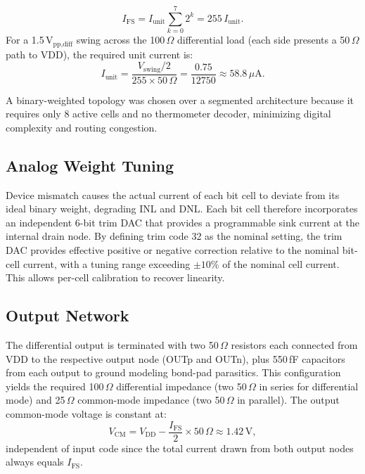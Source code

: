 \documentclass[lettersize,journal]{IEEEtran}
\begin{document}
%
\begin{equation}
  I_\text{FS} = I_\text{unit} \sum_{k=0}^{7} 2^k = 255\, I_\text{unit}.
  \label{eq:ifs}
\end{equation}
%
For a 1.5\,V$_{\text{pp,diff}}$ swing across the 100\,$\Omega$ differential load
(each side presents a 50\,$\Omega$ path to VDD), the required unit current is:
%
\begin{equation}
  I_\text{unit} = \frac{V_\text{swing}/2}{255 \times 50\,\Omega}
                = \frac{0.75}{12750} \approx 58.8\,\mu\text{A}.
  \label{eq:iunit}
\end{equation}

A binary-weighted topology was chosen over a segmented architecture because it
requires only 8 active cells and no thermometer decoder, minimizing digital
complexity and routing congestion.

\subsection{Analog Weight Tuning}

Device mismatch causes the actual current of each bit cell to deviate from its
ideal binary weight, degrading INL and DNL.
Each bit cell therefore incorporates an independent 6-bit trim DAC that provides a programmable sink current at the internal drain node. By defining trim code 32 as the nominal setting, the trim DAC provides effective positive or negative correction relative to the nominal bit-cell current, with a tuning range exceeding $\pm 10\%$ of the nominal cell current. This allows per-cell calibration to recover linearity.

\subsection{Output Network}

The differential output is terminated with two 50\,$\Omega$ resistors each
connected from VDD to the respective output node (OUTp and OUTn), plus
550\,fF capacitors from each output to ground modeling bond-pad parasitics.
This configuration yields the required 100\,$\Omega$ differential impedance
(two 50\,$\Omega$ in series for differential mode) and 25\,$\Omega$
common-mode impedance (two 50\,$\Omega$ in parallel).
The output common-mode voltage is constant at:
%
\begin{equation}
  V_\text{CM} = V_\text{DD} - \frac{I_\text{FS}}{2} \times 50\,\Omega \approx 1.42\,\text{V},
  \label{eq:vcm}
\end{equation}
%
independent of input code since the total current drawn from both output nodes
always equals $I_\text{FS}$.
\end{document}
